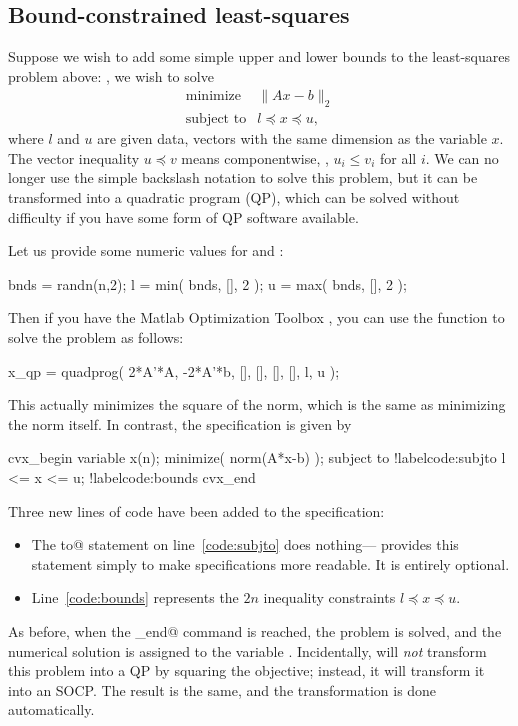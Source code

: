 \documentclass[12pt]{article}
\begin{document}
\subsection{Bound-constrained least-squares}
\label{sec:bcls}
\label{Least squares!Bound-constrained}
\label{Bound-constrained least squares}

Suppose we wish to add some simple upper and
lower bounds to the least-squares problem above: \ie, we wish to solve 
\begin{equation}
\begin{array}{ll}
\mbox{minimize} & \|Ax-b\|_2\\
\mbox{subject to} & l \preceq x \preceq u,
\end{array}
\label{eq:bcls}
\end{equation}
where $l$ and $u$ are given data, vectors with the same dimension
as the variable $x$.
The vector inequality $u \preceq v$ means componentwise, \ie,
$u_i \leq v_i$ for all $i$. We can no longer use the simple
backslash notation to solve this problem, but it can be transformed
into a quadratic program (QP), which can be solved without difficulty
if you have some form
of QP software available. 

Let us provide some numeric values for \verb@l@ and \verb@u@:
\begin{code2}[firstnumber=49]
	bnds = randn(n,2);
	l = min( bnds, [], 2 );
	u = max( bnds, [], 2 );
\end{code2}
Then if you have the Matlab
Optimization Toolbox \cite{MATOPT}, you can use the \verb@quadprog@ function
to solve the problem as follows:
\begin{code2}[firstnumber=55]
	x_qp = quadprog( 2*A'*A, -2*A'*b, [], [], [], [], l, u );
\end{code2}
This actually minimizes the square of the norm, which is the same as
minimizing the norm itself. In contrast, the \cvx specification is given by
\begin{code2}[firstnumber=61]
	cvx_begin
	    variable x(n);
	    minimize( norm(A*x-b) );
	    subject to			!label{code:subjto}
	        l <= x <= u;    !label{code:bounds}
	cvx_end
\end{code2}
Three new lines of \cvx code have been added to the \cvx specification:
\begin{itemize}
\item The \verb@subject to@ statement on line~\ref{code:subjto} does nothing---\cvx
provides this statement simply to make specifications more readable. 
It is entirely optional.
\item Line~\ref{code:bounds} represents the $2n$ inequality constraints $l \preceq x \preceq u$.
\end{itemize}
As before, when the \verb@cvx_end@ command is reached, the problem
is solved, and the numerical solution is assigned to the variable
\verb@x@. Incidentally, \cvx will 
\emph{not} transform this problem into a QP by squaring the objective;
instead, it will transform it
into an SOCP. The result is the same, and the transformation
is done automatically.
\end{document}
